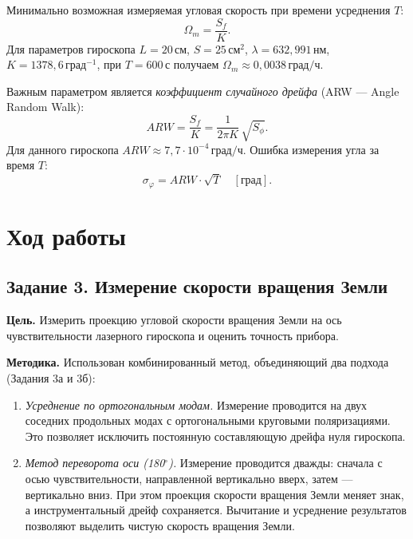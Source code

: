 \documentclass[12pt, a4paper]{article}
\newcommand{\unit}[1]{\text{#1}}
\begin{document}
Минимально возможная измеряемая угловая скорость при времени усреднения $T$:
\begin{equation}
    \Omega_m = \frac{S_f}{K}.
\end{equation}
Для параметров гироскопа $L = 20\,\unit{см}$, $S = 25\,\unit{см}^2$, $\lambda = 632{,}991\,\unit{нм}$, $K = 1378{,}6\,\unit{град}^{-1}$, при $T = 600\,\unit{с}$ получаем $\Omega_m \approx 0{,}0038\,\unit{град/ч}$.

Важным параметром является \textit{коэффициент случайного дрейфа} (ARW --- Angle Random Walk):
\begin{equation}
    ARW = \frac{S_f}{K} = \frac{1}{2\pi K}\,\sqrt{S_\phi}.
\end{equation}
Для данного гироскопа $ARW \approx 7{,}7 \cdot 10^{-4}\,\unit{град/ч}$. Ошибка измерения угла за время $T$:
\begin{equation}
    \sigma_\varphi = ARW \cdot \sqrt{T}\quad [\unit{град}].
\end{equation}











\section*{Ход работы}

\subsection*{Задание 3. Измерение скорости вращения Земли}

\textbf{Цель.} Измерить проекцию угловой скорости вращения Земли на ось чувствительности лазерного гироскопа и оценить точность прибора.

\textbf{Методика.} Использован комбинированный метод, объединяющий два подхода (Задания 3а и 3б):
\begin{enumerate}[leftmargin=1.5em]
    \item \textit{Усреднение по ортогональным модам.} Измерение проводится на двух соседних продольных модах с ортогональными круговыми поляризациями. Это позволяет исключить постоянную составляющую дрейфа нуля гироскопа.
    \item \textit{Метод переворота оси (180$^\circ$).} Измерение проводится дважды: сначала с осью чувствительности, направленной вертикально вверх, затем --- вертикально вниз. При этом проекция скорости вращения Земли меняет знак, а инструментальный дрейф сохраняется. Вычитание и усреднение результатов позволяют выделить чистую скорость вращения Земли.
\end{enumerate}
\end{document}
